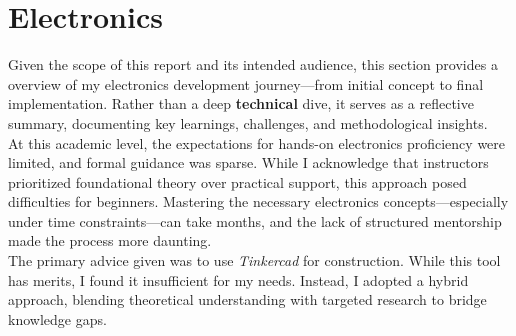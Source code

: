 \documentclass{article}
\begin{document}
\newpage{}
\section{Electronics}
Given the scope of this report and its intended audience, this section provides a overview of my electronics development journey---from initial concept to final implementation. Rather than a deep \textbf{technical} dive, it serves as a reflective summary, documenting key learnings, challenges, and methodological insights.\\[8pt]
At this academic level, the expectations for hands-on electronics proficiency were limited, and formal guidance was sparse. While I acknowledge that instructors prioritized foundational theory over practical support, this approach posed difficulties for beginners. Mastering the necessary electronics concepts---especially under time constraints---can take months, and the lack of structured mentorship made the process more daunting.\\[8pt]
The primary advice given was to use \textit{Tinkercad} for construction. While this tool has merits, I found it insufficient for my needs. Instead, I adopted a hybrid approach, blending theoretical understanding with targeted research to bridge knowledge gaps.
\vspace{-0.4em}
\end{document}
